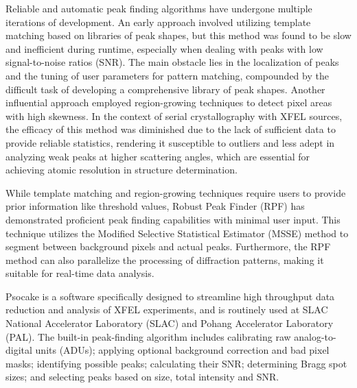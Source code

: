 \documentclass[conference]{IEEEtran}
\newcommand{\psocake}{Psocake}
\begin{document}
Reliable and automatic peak finding algorithms have undergone multiple
iterations of development.  An early approach involved utilizing template
matching \citep{wilkinsonIntegrationSinglecrystalReflections1988a} based on
libraries of peak shapes, but this method was found to be slow and inefficient
during runtime, especially when dealing with peaks with low signal-to-noise
ratios (SNR).  The main obstacle lies in the localization of peaks and the
tuning of user parameters for pattern matching, compounded by the difficult task
of developing a comprehensive library of peak shapes.  Another influential
approach employed region-growing techniques
\citep{bolotovskySeedSkewnessMethodIntegration1995,
bartyCheetahSoftwareHighthroughput2014} to detect pixel areas with high
skewness.  In the context of serial crystallography with XFEL sources, the
efficacy of this method was diminished due to the lack of sufficient data to
provide reliable statistics, rendering it susceptible to outliers and less adept
in analyzing weak peaks at higher scattering angles, which are essential for
achieving atomic resolution in structure determination.

While template matching and region-growing techniques require users to provide
prior information like threshold values, Robust Peak Finder (RPF)
\citep{hadian-jaziPeakfindingAlgorithmBased2017,
hadian-jaziDataReductionSerial2021} has demonstrated proficient peak finding
capabilities with minimal user input.  This technique utilizes the Modified
Selective Statistical Estimator (MSSE) method to segment between background
pixels and actual peaks.  Furthermore, the RPF method can also parallelize the
processing of diffraction patterns, making it suitable for real-time data
analysis.

\psocake{} is a software specifically designed to streamline high throughput
data reduction and analysis of XFEL experiments, and is routinely used at SLAC
National Accelerator Laboratory (SLAC) and Pohang Accelerator Laboratory (PAL).
The built-in peak-finding algorithm \citep{shinDataAnalysisUsing2018} includes
calibrating raw analog-to-digital units (ADUs); applying optional background
correction and bad pixel masks; identifying possible peaks; calculating their
SNR; determining Bragg spot sizes; and selecting peaks based on size, total
intensity and SNR.
\end{document}
